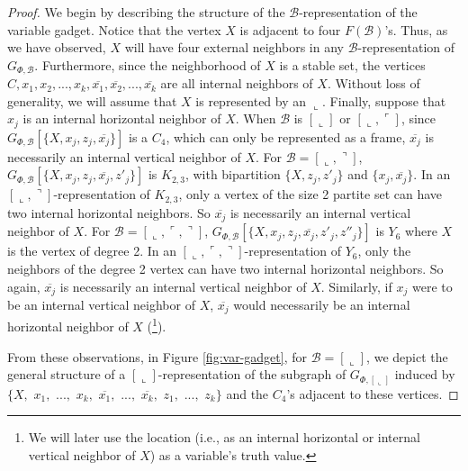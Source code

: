 \documentclass[11pt,3p,times]{elsarticle}
\newenvironment{myproof}{\begin{proof}}{\end{proof}}
\newcommand{\La}{\ensuremath{\llcorner}} \newcommand{\Lb}{\ensuremath{\ulcorner}} \newcommand{\Lc}{\ensuremath{\lrcorner}} \newcommand{\Ld}{\ensuremath{\urcorner}}
\begin{document}
\begin{myproof}
We begin by describing the structure of the $\mathcal{B}$-representation
of the variable gadget. Notice that the vertex $X$ is adjacent to
four $F(\mathcal{B})$'s. Thus, as we have observed, $X$ will have four
external neighbors in any $\mathcal{B}$-representation of $G_{\Phi,\mathcal{B}}$.
Furthermore, since the neighborhood of $X$ is a stable set, the
vertices $C, x_1, x_2, ..., x_k, \overline{x_1}, \overline{x_2},
..., \overline{x_k}$ are all internal neighbors of $X$. Without loss of
generality, we will assume that $X$ is represented by an $\La$. Finally,
suppose that $x_j$ is an internal horizontal neighbor of $X$. When $\mathcal{B}$
is $[\La]$ or $[\La,\Lb]$,
since $G_{\Phi,\mathcal{B}}[\{X,x_j,z_j, \overline{x_j}\}]$ is a $C_4$,
which can only be represented as a frame,
$\overline{x_j}$ is necessarily an internal vertical neighbor of
$X$. For $\mathcal{B}=[\La,\Ld]$,
$G_{\Phi,\mathcal{B}}[\{X,x_j,z_j, \overline{x_j},z'_j\}]$ is $K_{2,3}$,
with bipartition $\{X,z_j,z'_j\}$ and $\{x_j,\overline{x_j}\}$. In an
$[\La,\Ld]$-representation of $K_{2,3}$, only a vertex of the size 2 partite set
can have two internal horizontal neighbors.  So $\overline{x_j}$ is necessarily an
internal vertical neighbor of $X$. For $\mathcal{B}=[\La,\Lb,\Ld]$,
$G_{\Phi,\mathcal{B}}[\{X,x_j,z_j, \overline{x_j},z'_j, z''_j\}]$ is $Y_6$ where
$X$ is the vertex of degree 2.  In an $[\La,\Lb,\Ld]$-representation of $Y_6$, only
the neighbors of the degree 2 vertex can have two internal horizontal neighbors.
So again, $\overline{x_j}$ is necessarily an
internal vertical neighbor of $X$. Similarly, if $x_j$ were to be an internal vertical neighbor
of $X$, $\overline{x_j}$ would necessarily be an internal
horizontal neighbor of $X$ (\footnote{We will later use the
location (i.e., as an internal horizontal or internal vertical
neighbor of $X$) as a variable's truth value.}).

From these
observations, in Figure \ref{fig:var-gadget}, for $\mathcal{B}=[\La]$,
we depict the general structure of a
$[\La]$-representation of the subgraph of $G_{\Phi,[\La]}$ induced by
$\{X,$ $x_1,$ $...,$ $x_k,$ $\overline{x_1},$ $...,$
$\overline{x_k},$ $z_1,$ $...,$ $z_k\}$ and the $C_4$'s adjacent to
these vertices.


\end{myproof}
\end{document}
